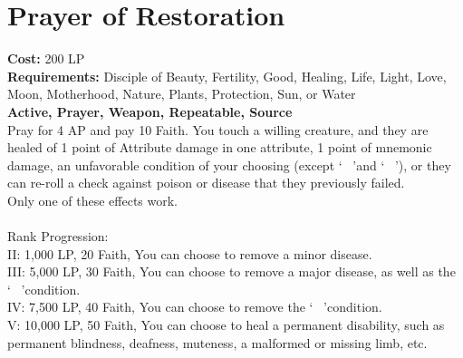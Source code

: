 \section{Prayer of Restoration}\label{prayer:restoration}
\textbf{Cost:} 200 LP\\
\textbf{Requirements:} Disciple of Beauty, Fertility, Good, Healing, Life, Light, Love, Moon, Motherhood, Nature, Plants, Protection, Sun, or Water \\
\textbf{Active, Prayer, Weapon, Repeatable, Source}\\
Pray for 4 AP and pay 10 Faith.
You touch a willing creature, and they are healed of 1 point of Attribute damage in one attribute, 1 point of mnemonic damage, an unfavorable condition of your choosing (except \lq ~ \rq and \lq ~ \rq), or they can re-roll a check against poison or disease that they previously failed.\\
Only one of these effects work.\\
\\
Rank Progression:\\
II: 1,000 LP, 20 Faith, You can choose to remove a minor disease.\\
III: 5,000 LP, 30 Faith, You can choose to remove a major disease, as well as the \lq ~ \rq condition.\\
IV: 7,500 LP, 40 Faith, You can choose to remove the \lq ~ \rq condition.\\
V: 10,000 LP, 50 Faith, You can choose to heal a permanent disability, such as permanent blindness, deafness, muteness, a malformed or missing limb, etc.\\